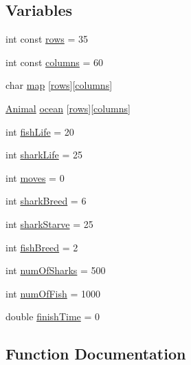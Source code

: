 \subsection*{Variables}
\begin{DoxyCompactItemize}
\item 
int const \hyperlink{wa-tor_8cpp_a586c34fe492dfaa733327c99e8cef1a7}{rows} = 35
\item 
int const \hyperlink{wa-tor_8cpp_a257ffd4af4f5b4a1792800a1da461fff}{columns} = 60
\item 
char \hyperlink{wa-tor_8cpp_a00bd8baeb581f6c8c6184c92b0514093}{map} \mbox{[}\hyperlink{wa-tor_8cpp_a586c34fe492dfaa733327c99e8cef1a7}{rows}\mbox{]}\mbox{[}\hyperlink{wa-tor_8cpp_a257ffd4af4f5b4a1792800a1da461fff}{columns}\mbox{]}
\item 
\hyperlink{class_animal}{Animal} \hyperlink{wa-tor_8cpp_ab8d425e802a7efbde7aee8ec63cf4109}{ocean} \mbox{[}\hyperlink{wa-tor_8cpp_a586c34fe492dfaa733327c99e8cef1a7}{rows}\mbox{]}\mbox{[}\hyperlink{wa-tor_8cpp_a257ffd4af4f5b4a1792800a1da461fff}{columns}\mbox{]}
\item 
int \hyperlink{wa-tor_8cpp_ae43dd048cc055db4f5afb2e51cda10d0}{fish\+Life} = 20
\item 
int \hyperlink{wa-tor_8cpp_a96baa8a35a57c2160fc29962b37e55b0}{shark\+Life} = 25
\item 
int \hyperlink{wa-tor_8cpp_a750943ec425a1b8104d0ed4a6f4073d3}{moves} = 0
\item 
int \hyperlink{wa-tor_8cpp_afe6bb1e77490b7b4d687dfebbffc0cba}{shark\+Breed} = 6
\item 
int \hyperlink{wa-tor_8cpp_a19573e234a78bbb14760f70a56297b97}{shark\+Starve} = 25
\item 
int \hyperlink{wa-tor_8cpp_a698d64c39d139b47bf8f1640d821b8b6}{fish\+Breed} = 2
\item 
int \hyperlink{wa-tor_8cpp_a8061b966958cc5112773ab457c12519f}{num\+Of\+Sharks} = 500
\item 
int \hyperlink{wa-tor_8cpp_a025064445afb61c29cfa42c27fe243ec}{num\+Of\+Fish} = 1000
\item 
double \hyperlink{wa-tor_8cpp_a7cc6537125267d34b92ee58c7d5fa264}{finish\+Time} = 0
\end{DoxyCompactItemize}


\subsection{Function Documentation}
